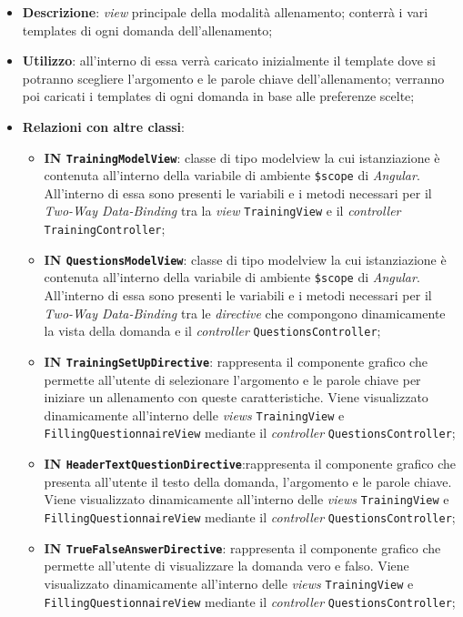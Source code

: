 \begin{itemize}
	\item \textbf{Descrizione}: \textit{view} principale della modalità allenamento; conterrà i vari templates di ogni domanda dell'allenamento;
	\item \textbf{Utilizzo}: all'interno di essa verrà caricato inizialmente il template dove si potranno scegliere l'argomento e le parole chiave dell'allenamento; verranno poi caricati i templates di ogni domanda in base alle preferenze scelte; 
	\item \textbf{Relazioni con altre classi}:
	\begin{itemize}
		\item \textbf{IN \texttt{TrainingModelView}}: classe di tipo modelview la cui istanziazione è contenuta all'interno della variabile di ambiente \texttt{\$scope} di \textit{Angular}. All'interno di essa sono presenti le variabili e i metodi necessari per il \textit{Two-Way Data-Binding} tra la \textit{view} \texttt{TrainingView} e il \textit{controller} \texttt{TrainingController};
		\item \textbf{IN \texttt{QuestionsModelView}}: classe di tipo modelview la cui istanziazione è contenuta all'interno della variabile di ambiente \texttt{\$scope} di \textit{Angular}. All'interno di essa sono presenti le variabili e i metodi necessari per il \textit{Two-Way Data-Binding} tra le \textit{directive} che compongono dinamicamente la vista della domanda e il \textit{controller} \texttt{QuestionsController};
		\item \textbf{IN \texttt{TrainingSetUpDirective}}: rappresenta il componente grafico che permette all'utente di selezionare l'argomento e le parole chiave per iniziare un allenamento con queste caratteristiche. Viene visualizzato	dinamicamente all'interno delle \textit{views} \texttt{TrainingView} e \texttt{FillingQuestionnaireView} mediante il \textit{controller} \texttt{QuestionsController};
		\item \textbf{IN \texttt{HeaderTextQuestionDirective}}:rappresenta il componente grafico che presenta all'utente il testo della domanda, l'argomento e le parole chiave. Viene visualizzato dinamicamente all'interno delle \textit{views} \texttt{TrainingView} e \texttt{FillingQuestionnaireView} mediante il \textit{controller} \texttt{QuestionsController};
		\item \textbf{IN \texttt{TrueFalseAnswerDirective}}: rappresenta il componente grafico che permette all'utente di visualizzare la domanda vero e falso. Viene visualizzato dinamicamente all'interno delle \textit{views} \texttt{TrainingView} e \texttt{FillingQuestionnaireView} mediante il \textit{controller} \texttt{QuestionsController};

\end{itemize}
\end{itemize}
